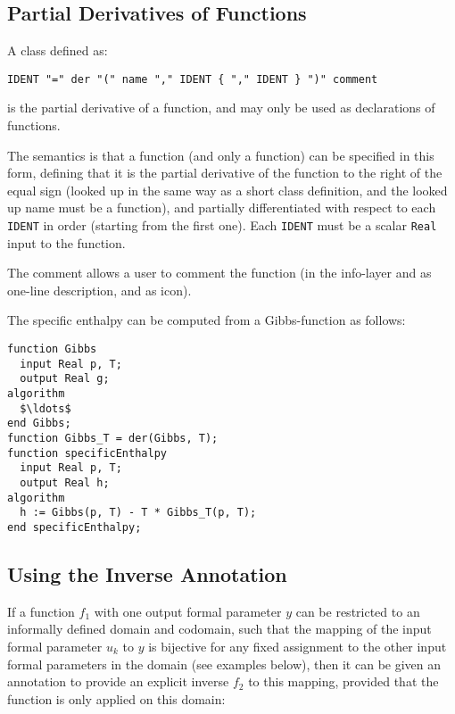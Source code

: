 \subsection{Partial Derivatives of Functions}\label{partial-derivatives-of-functions}

A class defined as:
\begin{lstlisting}[language=grammar]
IDENT "=" der "(" name "," IDENT { "," IDENT } ")" comment
\end{lstlisting}
is the partial derivative of a function, and may only be used as declarations of functions.

The semantics is that a function (and only a function) can be specified in this form, defining that it is the partial derivative of the function to the right of the equal sign (looked up in the same way as a short class definition, and the looked up name must be a function), and partially differentiated with respect to each {\lstinline!IDENT!} in order (starting from the first one).
Each {\lstinline!IDENT!} must be a scalar {\lstinline!Real!} input to the function.

The comment allows a user to comment the function (in the info-layer and as one-line description, and as icon).

\begin{example}
The specific enthalpy can be computed from a Gibbs-function as follows:
\begin{lstlisting}[language=modelica]
function Gibbs
  input Real p, T;
  output Real g;
algorithm
  $\ldots$
end Gibbs;
function Gibbs_T = der(Gibbs, T);
function specificEnthalpy
  input Real p, T;
  output Real h;
algorithm
  h := Gibbs(p, T) - T * Gibbs_T(p, T);
end specificEnthalpy;
\end{lstlisting}
\end{example}


\subsection{Using the Inverse Annotation}\label{using-the-inverse-annotation}

If a function $f_1$ with one output formal parameter $y$ can be restricted to an informally defined domain and codomain, such that the mapping of the input formal parameter $u_{k}$ to $y$ is bijective for any fixed assignment to the other input formal parameters in the domain (see examples below), then it can be given an  annotation to provide an explicit inverse $f_2$ to this mapping, provided that the function is only applied on this domain:

